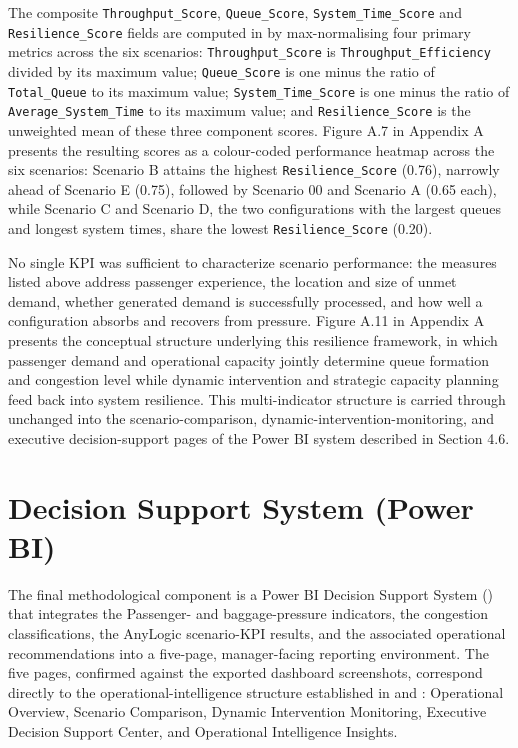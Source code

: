 The composite \nolinkurl{Throughput_Score}, \nolinkurl{Queue_Score}, \nolinkurl{System_Time_Score} and \nolinkurl{Resilience_Score} fields are computed in  by max-normalising four primary metrics across the six scenarios: \nolinkurl{Throughput_Score} is \nolinkurl{Throughput_Efficiency} divided by its maximum value; \nolinkurl{Queue_Score} is one minus the ratio of \nolinkurl{Total_Queue} to its maximum value; \nolinkurl{System_Time_Score} is one minus the ratio of \nolinkurl{Average_System_Time} to its maximum value; and \nolinkurl{Resilience_Score} is the unweighted mean of these three component scores. Figure A.7 in Appendix A presents the resulting scores as a colour-coded performance heatmap across the six scenarios: Scenario B attains the highest \nolinkurl{Resilience_Score} (0.76), narrowly ahead of Scenario E (0.75), followed by Scenario 00 and Scenario A (0.65 each), while Scenario C and Scenario D, the two configurations with the largest queues and longest system times, share the lowest \nolinkurl{Resilience_Score} (0.20).

No single KPI was sufficient to characterize scenario performance: the measures listed above address passenger experience, the location and size of unmet demand, whether generated demand is successfully processed, and how well a configuration absorbs and recovers from pressure. Figure A.11 in Appendix A presents the conceptual structure underlying this resilience framework, in which passenger demand and operational capacity jointly determine queue formation and congestion level while dynamic intervention and strategic capacity planning feed back into system resilience. This multi-indicator structure is carried through unchanged into the scenario-comparison, dynamic-intervention-monitoring, and executive decision-support pages of the Power BI system described in Section 4.6.

\section{Decision Support System (Power BI)}
\label{sec:decision-support-system}

The final methodological component is a Power BI Decision Support System () that integrates the Passenger- and baggage-pressure indicators, the congestion classifications, the AnyLogic scenario-KPI results, and the associated operational recommendations into a five-page, manager-facing reporting environment. The five pages, confirmed against the exported dashboard screenshots, correspond directly to the operational-intelligence structure established in  and : Operational Overview, Scenario Comparison, Dynamic Intervention Monitoring, Executive Decision Support Center, and Operational Intelligence Insights.

